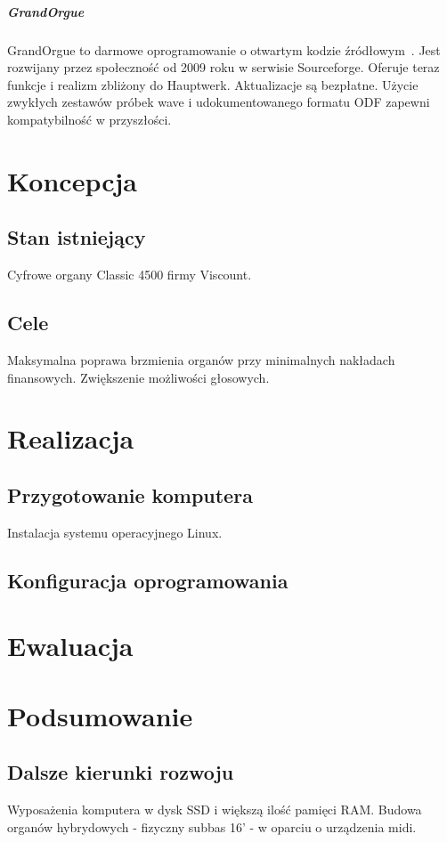 \documentclass[11pt]{report}
\begin{document}
    \paragraph{GrandOrgue}
    GrandOrgue to darmowe oprogramowanie o otwartym kodzie źródłowym~\cite{grandorgue}.
    Jest rozwijany przez społeczność od 2009 roku w serwisie Sourceforge.
    Oferuje teraz funkcje i realizm zbliżony do Hauptwerk.
    Aktualizacje są bezpłatne.
    Użycie zwykłych zestawów próbek wave i udokumentowanego formatu ODF zapewni kompatybilność w przyszłości.


    \chapter{Koncepcja}


    \section{Stan istniejący}
    Cyfrowe organy Classic 4500 firmy Viscount.


    \section{Cele}
    Maksymalna poprawa brzmienia organów przy minimalnych nakładach finansowych.
    Zwiększenie możliwości głosowych.


    \chapter{Realizacja}


    \section{Przygotowanie komputera}
    Instalacja systemu operacyjnego Linux.

    \section{Konfiguracja oprogramowania}


    \chapter{Ewaluacja}


    \chapter{Podsumowanie}


    \section{Dalsze kierunki rozwoju}
    Wyposażenia komputera w dysk SSD i większą ilość pamięci RAM.
    Budowa organów hybrydowych - fizyczny subbas 16' - w oparciu o urządzenia midi.


    \newpage

    \nocite{*}
    \printbibliography[title={Bibliografia}]
\end{document}
